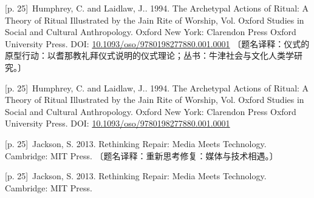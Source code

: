\documentclass[10pt,a4paper]{article}
\begin{document}
\noindent\begin{minipage}{\textwidth}\begin{minipage}[t]{\dimexpr.5\textwidth-4mm\relax}\noindent\begin{minipage}[t]{\linewidth}{\scriptsize\color{gray} [p. 25]}\ Humphrey, C. and Laidlaw, J.. 1994. The Archetypal Actions of Ritual: A Theory of Ritual Illustrated by the Jain Rite of Worship, Vol. Oxford Studies in Social and Cultural Anthropology. Oxford New York: Clarendon Press Oxford University Press. DOI: \url{10.1093/oso/9780198277880.001.0001} 〔题名译释：仪式的原型行动：以耆那教礼拜仪式说明的仪式理论；丛书：牛津社会与文化人类学研究。〕\par\end{minipage}\par\end{minipage}\hfill\begin{minipage}[t]{\dimexpr.5\textwidth-4mm\relax}\noindent\begin{minipage}[t]{\linewidth}{\scriptsize\color{gray} [p. 25]}\ Humphrey, C. and Laidlaw, J.. 1994. The Archetypal Actions of Ritual: A Theory of Ritual Illustrated by the Jain Rite of Worship, Vol. Oxford Studies in Social and Cultural Anthropology. Oxford New York: Clarendon Press Oxford University Press. DOI: \url{10.1093/oso/9780198277880.001.0001}\par\end{minipage}\par\end{minipage}\end{minipage}\par
\noindent\begin{minipage}{\textwidth}\begin{minipage}[t]{\dimexpr.5\textwidth-4mm\relax}\noindent\begin{minipage}[t]{\linewidth}{\scriptsize\color{gray} [p. 25]}\ Jackson, S. 2013. Rethinking Repair: Media Meets Technology. Cambridge: MIT Press. 〔题名译释：重新思考修复：媒体与技术相遇。〕\par\end{minipage}\par\end{minipage}\hfill\begin{minipage}[t]{\dimexpr.5\textwidth-4mm\relax}\noindent\begin{minipage}[t]{\linewidth}{\scriptsize\color{gray} [p. 25]}\ Jackson, S. 2013. Rethinking Repair: Media Meets Technology. Cambridge: MIT Press.\par\end{minipage}\par\end{minipage}\end{minipage}\par
\end{document}

